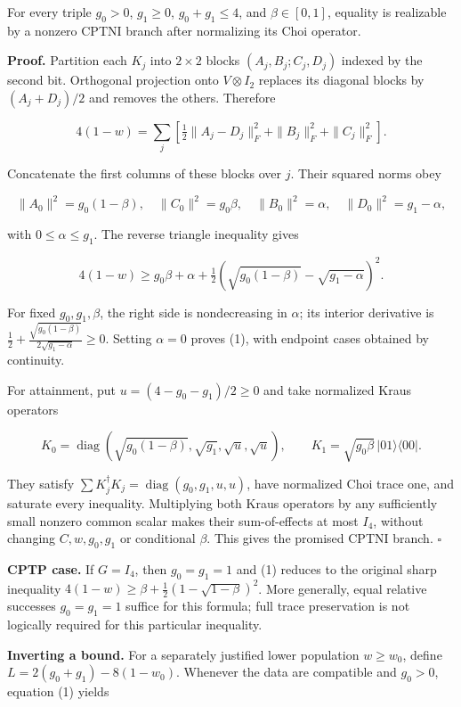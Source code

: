 \documentclass[
  10pt,
  a4paper,
]{article}
\begin{document}
For every triple \(g_0>0\), \(g_1\ge0\), \(g_0+g_1\le4\), and \(\beta\in[0,1]\), equality is realizable by a nonzero CPTNI branch after normalizing its Choi operator.

\textbf{Proof.} Partition each \(K_j\) into \(2\times2\) blocks \((A_j,B_j;C_j,D_j)\) indexed by the second bit. Orthogonal projection onto \(V\otimes I_2\) replaces its diagonal blocks by \((A_j+D_j)/2\) and removes the others. Therefore

\[
4(1-w)=\sum_j\left[\tfrac12\|A_j-D_j\|_F^2+\|B_j\|_F^2+\|C_j\|_F^2\right].
\]

Concatenate the first columns of these blocks over \(j\). Their squared norms obey

\[
\|A_0\|^2=g_0(1-\beta),\quad \|C_0\|^2=g_0\beta,\quad
\|B_0\|^2=\alpha,\quad \|D_0\|^2=g_1-\alpha,
\]

with \(0\le\alpha\le g_1\). The reverse triangle inequality gives

\[
4(1-w)\ge g_0\beta+\alpha+
\tfrac12\left(\sqrt{g_0(1-\beta)}-\sqrt{g_1-\alpha}\right)^2.
\]

For fixed \(g_0,g_1,\beta\), the right side is nondecreasing in \(\alpha\); its interior derivative is \(\frac12+\frac{\sqrt{g_0(1-\beta)}}{2\sqrt{g_1-\alpha}}\ge0\). Setting \(\alpha=0\) proves (1), with endpoint cases obtained by continuity.

For attainment, put \(u=(4-g_0-g_1)/2\ge0\) and take normalized Kraus operators

\[
K_0=\operatorname{diag}\left(\sqrt{g_0(1-\beta)},\sqrt{g_1},\sqrt u,\sqrt u\right),
\qquad K_1=\sqrt{g_0\beta}\,|01\rangle\langle00|.
\]

They satisfy \(\sum K_j^\dagger K_j=\operatorname{diag}(g_0,g_1,u,u)\), have normalized Choi trace one, and saturate every inequality. Multiplying both Kraus operators by any sufficiently small nonzero common scalar makes their sum-of-effects at most \(I_4\), without changing \(C,w,g_0,g_1\) or conditional \(\beta\). This gives the promised CPTNI branch. \(\square\)

\textbf{CPTP case.} If \(G=I_4\), then \(g_0=g_1=1\) and (1) reduces to the original sharp inequality \(4(1-w)\ge\beta+\frac12(1-\sqrt{1-\beta})^2\). More generally, equal relative successes \(g_0=g_1=1\) suffice for this formula; full trace preservation is not logically required for this particular inequality.

\textbf{Inverting a bound.} For a separately justified lower population \(w\ge w_0\), define \(L=2(g_0+g_1)-8(1-w_0)\). Whenever the data are compatible and \(g_0>0\), equation (1) yields
\end{document}
